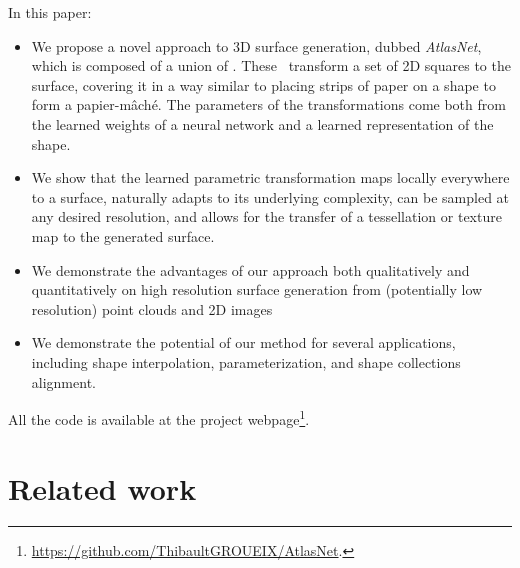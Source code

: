 \documentclass[10pt,twocolumn,letterpaper]{article}
\newcommand{\myparagraph}[1]{\vspace{3pt}\noindent{\bf #1}}
\newcommand{\ournet}{AtlasNet}
\begin{document}
\myparagraph{Our contributions.} 
In this paper:
\begin{itemize}
  \vspace*{-1mm}
    \item We propose a novel approach to 3D surface generation, dubbed {\it \ournet}, which is composed of a union of \patches. These \patches~transform a set of 2D squares to the surface, covering it in a way similar to placing strips of paper on a shape to form a papier-m\^ach\'e. The parameters of the transformations come both from the learned weights of a neural network and a learned representation of the shape. 
      \vspace*{-1mm}
    \item We show that the learned parametric transformation maps locally everywhere to a surface, naturally adapts to its underlying complexity, can be sampled at any desired resolution, and allows for the transfer of a tessellation or texture map to the generated surface. 
      \vspace*{-1mm}
    \item We demonstrate the advantages of our approach both qualitatively and quantitatively on high resolution surface generation from (potentially low resolution) point clouds and 2D images
      \vspace*{-1mm}
    \item We demonstrate the potential of our method for several applications, including shape interpolation, parameterization, and shape collections alignment. 
\end{itemize}
All the code is available at the project webpage\footnote{\url{https://github.com/ThibaultGROUEIX/AtlasNet}.}. 
 
\section{Related work}
\label{sec:related}
\end{document}
